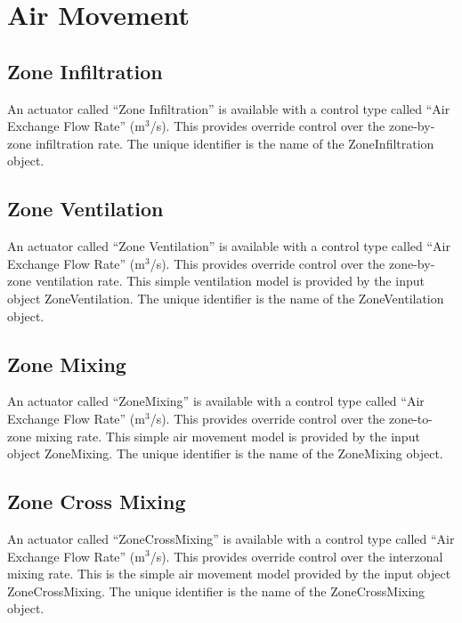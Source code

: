 \section{Air Movement}\label{air-movement}

\subsection{Zone Infiltration}\label{zone-infiltration}

An actuator called ``Zone Infiltration'' is available with a control type called ``Air Exchange Flow Rate'' (m\(^{3}\)/s). This provides override control over the zone-by-zone infiltration rate. The unique identifier is the name of the ZoneInfiltration object.

\subsection{Zone Ventilation}\label{zone-ventilation}

An actuator called ``Zone Ventilation'' is available with a control type called ``Air Exchange Flow Rate'' (m\(^{3}\)/s). This provides override control over the zone-by-zone ventilation rate. This simple ventilation model is provided by the input object ZoneVentilation. The unique identifier is the name of the ZoneVentilation object.

\subsection{Zone Mixing}\label{zone-mixing}

An actuator called ``ZoneMixing'' is available with a control type called ``Air Exchange Flow Rate'' (m\(^{3}\)/s). This provides override control over the zone-to-zone mixing rate. This simple air movement model is provided by the input object ZoneMixing. The unique identifier is the name of the ZoneMixing object.

\subsection{Zone Cross Mixing}\label{zone-cross-mixing}

An actuator called ``ZoneCrossMixing'' is available with a control type called ``Air Exchange Flow Rate'' (m\(^{3}\)/s). This provides override control over the interzonal mixing rate. This is the simple air movement model provided by the input object ZoneCrossMixing. The unique identifier is the name of the ZoneCrossMixing object.


